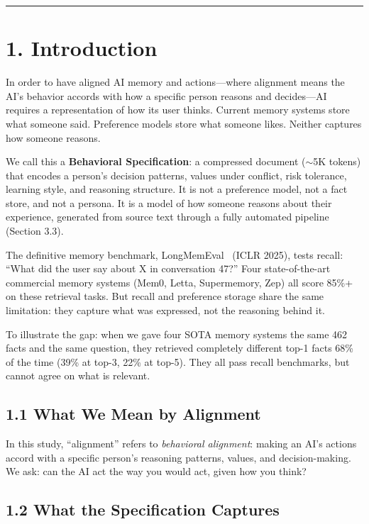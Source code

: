 \documentclass[11pt,a4paper]{article}
\begin{document}
\vspace{1em}
\hrule
\vspace{1em}

\section{1. Introduction}

In order to have aligned AI memory and actions---where alignment means the AI's behavior
accords with how a specific person reasons and decides---AI requires a representation of how
its user thinks. Current memory systems store what someone said. Preference models store what
someone likes. Neither captures how someone reasons.

We call this a \textbf{Behavioral Specification}: a compressed document ($\sim$5K tokens)
that encodes a person's decision patterns, values under conflict, risk tolerance, learning
style, and reasoning structure. It is not a preference model, not a fact store, and not a
persona. It is a model of how someone reasons about their experience, generated from source
text through a fully automated pipeline (Section 3.3).

The definitive memory benchmark, LongMemEval~\citep{he2025longmemeval} (ICLR 2025), tests
recall: ``What did the user say about X in conversation 47?'' Four state-of-the-art commercial
memory systems (Mem0, Letta, Supermemory, Zep) all score 85\%+ on these retrieval tasks.
But recall and preference storage share the same limitation: they capture what was expressed,
not the reasoning behind it.

To illustrate the gap: when we gave four SOTA memory systems the same 462 facts and the same
question, they retrieved completely different top-1 facts 68\% of the time (39\% at top-3,
22\% at top-5). They all pass recall benchmarks, but cannot agree on what is relevant.

\subsection{1.1 What We Mean by Alignment}

In this study, ``alignment'' refers to \textit{behavioral alignment}: making an AI's actions
accord with a specific person's reasoning patterns, values, and decision-making. We ask:
can the AI act the way you would act, given how you think?

\subsection{1.2 What the Specification Captures}
\end{document}
